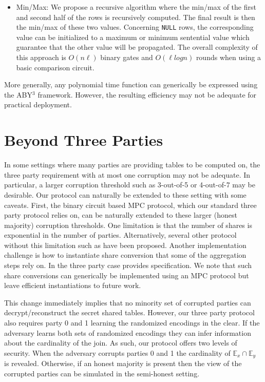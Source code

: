 \begin{itemize}
	\item  Min/Max: We propose a recursive algorithm where the min/max of the first and second half of the rows is recursively computed. The final result is then the min/max of these two values.  Concerning \texttt{NULL} rows, the corresponding value can be initialized to a maximum or minimum sentential value which guarantee that the other value will be propagated. The overall complexity of this approach is $O(n\ell)$ binary gates and $O(\ell log n)$ rounds when using a basic comparison circuit\cite{aby3}.
\end{itemize}

More generally, any polynomial time function can generically be expressed using the ABY$^3$ framework\cite{aby3}. However, the resulting efficiency may not be adequate for practical deployment.  

\section{Beyond Three Parties}


In some settings where many parties are providing tables to be computed on, the three party requirement with at most one corruption may not be adequate. In particular, a larger corruption threshold such as 3-out-of-5 or 4-out-of-7 may be desirable. Our protocol can naturally be extended to these setting with some caveats. First, the binary circuit based MPC protocol\cite{highthroughput}, which our standard three party protocol relies on, can be naturally extended to these larger (honest majority) corruption thresholds. One limitation is that the number of shares is exponential in the number of parties.  Alternatively, several other protocol without this limitation such as\cite{DBLP:conf/crypto/ChidaGHIKLN18} have been proposed. Another implementation challenge is how to instantiate share conversion that some of the aggregation steps rely on. In the three party case \cite{aby3} provides specification. We note that such share conversions can generically be implemented using an MPC protocol but leave efficient instantiations to future work.

This change immediately implies that no minority set of corrupted parties can decrypt/reconstruct the secret shared tables. However, our three party protocol also requires party 0 and 1 learning the randomized encodings in the clear. If the adversary learns both sets of randomized encodings they can infer information about the cardinality of the join. As such, our protocol offers two levels of security. When the adversary corrupts parties 0 and 1 the cardinality of $\mathbb{E}_x \cap \mathbb{E}_y$ is revealed. Otherwise, if an honest majority is present then the view of the corrupted parties can be simulated in the semi-honest setting. 



